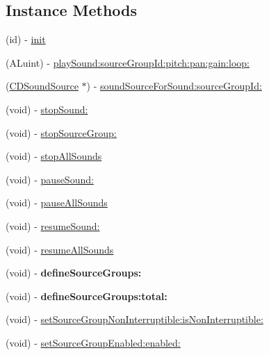 \subsection*{Instance Methods}
\begin{DoxyCompactItemize}
\item 
(id) -\/ \hyperlink{interfaceCDSoundEngine_a013cb9b6cf86c0dbfca8fac6aae0bd6a}{init}
\item 
(A\+Luint) -\/ \hyperlink{interfaceCDSoundEngine_a03aee643e250635e2594e5ced4fbe7b2}{play\+Sound\+:source\+Group\+Id\+:pitch\+:pan\+:gain\+:loop\+:}
\item 
(\hyperlink{interfaceCDSoundSource}{C\+D\+Sound\+Source} $\ast$) -\/ \hyperlink{interfaceCDSoundEngine_ab0c372cb85df05a4070b8f8bd2213efd}{sound\+Source\+For\+Sound\+:source\+Group\+Id\+:}
\item 
(void) -\/ \hyperlink{interfaceCDSoundEngine_ae2bbd23eefecd32afcf6bc0109b5e7a2}{stop\+Sound\+:}
\item 
(void) -\/ \hyperlink{interfaceCDSoundEngine_a5d6fbd530895fac2ce486a478e46fb23}{stop\+Source\+Group\+:}
\item 
(void) -\/ \hyperlink{interfaceCDSoundEngine_a8bbc63632a5e72c9235c39730e8efb38}{stop\+All\+Sounds}
\item 
(void) -\/ \hyperlink{interfaceCDSoundEngine_afd1f581938bf541447eaa9430712fff7}{pause\+Sound\+:}
\item 
(void) -\/ \hyperlink{interfaceCDSoundEngine_ac84ad4fe69381aa32b836f8a3a1b5e1f}{pause\+All\+Sounds}
\item 
(void) -\/ \hyperlink{interfaceCDSoundEngine_ad5ce097385bf2a6a347f418bfcbfeb54}{resume\+Sound\+:}
\item 
(void) -\/ \hyperlink{interfaceCDSoundEngine_a307f8d30e7fb5c7f29edbaea19709741}{resume\+All\+Sounds}
\item 
\mbox{\label{interfaceCDSoundEngine_a5940b79595deabff5cab67987133c518}} 
(void) -\/ {\bfseries define\+Source\+Groups\+:}
\item 
\mbox{\label{interfaceCDSoundEngine_a34ecd46964f13229c005cec18092be9f}} 
(void) -\/ {\bfseries define\+Source\+Groups\+:total\+:}
\item 
(void) -\/ \hyperlink{interfaceCDSoundEngine_afd29660acffd4fd1f7a667e4a389f84a}{set\+Source\+Group\+Non\+Interruptible\+:is\+Non\+Interruptible\+:}
\item 
(void) -\/ \hyperlink{interfaceCDSoundEngine_ae791fe92a23a27d282fff5108ed8b8c0}{set\+Source\+Group\+Enabled\+:enabled\+:}

\end{DoxyCompactItemize}
